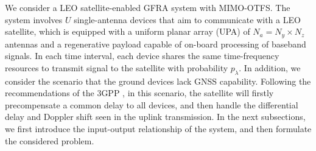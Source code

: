 \documentclass[conference]{IEEEtran}
\begin{document}
	We consider a LEO satellite-enabled GFRA system with MIMO-OTFS. The system involves $U$ single-antenna devices that aim to communicate with a LEO satellite, which is equipped with a uniform planar array (UPA) of $N_a = N_y \times N_z$ antennas and a regenerative payload capable of on-board processing of baseband signals. In each time interval, each device shares the same time-frequency resources to transmit signal to the satellite with probability $p_{\lambda}$. In addition, we consider the scenario that the ground devices lack GNSS capability. Following the recommendations of the 3GPP \cite{3gpp}, in this scenario, the satellite will firstly precompensate a common delay to all devices, and then handle the differential delay and Doppler shift seen in the uplink transmission. In the next subsections, we first introduce the input-output relationship of the system, and then formulate the considered problem.
		
\end{document}
